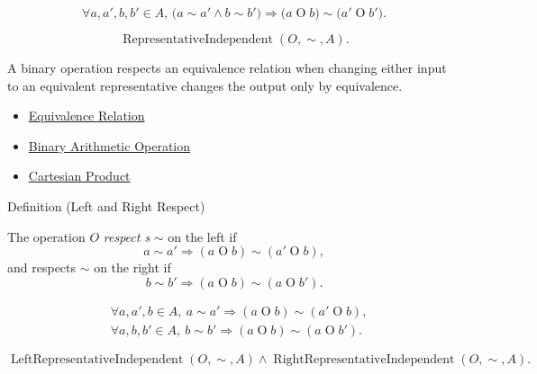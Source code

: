 \begin{remark*}
\[
\forall a,a',b,b'\in A,\,
\bigl(a\sim a'\land b\sim b'\bigr)
\Longrightarrow
\bigl(a\mathbin{O}b\bigr)\sim\bigl(a'\mathbin{O}b'\bigr).
\]
\end{remark*}

\begin{remark*}
\[
\operatorname{RepresentativeIndependent}(O,\sim,A).
\]
\end{remark*}

\begin{remark*}[Interpretation]
A binary operation respects an equivalence relation when changing either
input to an equivalent representative changes the output only by equivalence.
\end{remark*}

\begin{dependencies}
\begin{itemize}
  \item \hyperref[def:equivalence-relation]{Equivalence Relation}
  \item \hyperref[def:binary-arithmetic-operation]{Binary Arithmetic Operation}
  \item \hyperref[def:cartesian-product-rel]{Cartesian Product}
\end{itemize}
\end{dependencies}

\begin{definitionbox}{Definition (Left and Right Respect)}
\begin{definition}
\label{def:left-right-respect-equivalence}
The operation $O$ \emph{respect
s} $\sim$ on the left if
\[
a\sim a'\Longrightarrow (a\mathbin{O}b)\sim(a'\mathbin{O}b),
\]
and respects $\sim$ on the right if
\[
b\sim b'\Longrightarrow (a\mathbin{O}b)\sim(a\mathbin{O}b').
\]
\end{definition}
\end{definitionbox}

\begin{remark*}
\[
\begin{aligned}
&\forall a,a',b\in A,\ a\sim a'\Longrightarrow (a\mathbin{O}b)\sim(a'\mathbin{O}b),\\
&\forall a,b,b'\in A,\ b\sim b'\Longrightarrow (a\mathbin{O}b)\sim(a\mathbin{O}b').
\end{aligned}
\]
\end{remark*}

\begin{remark*}
\[
\operatorname{LeftRepresentativeIndependent}(O,\sim,A)
\land
\operatorname{RightRepresentativeIndependent}(O,\sim,A).
\]
\end{remark*}

